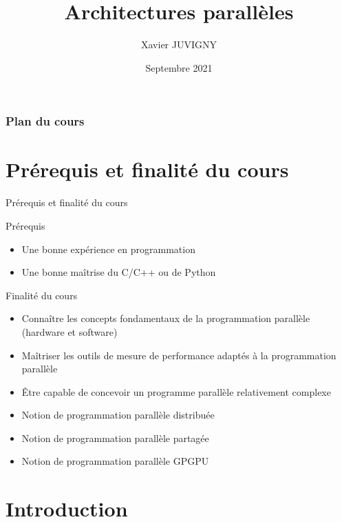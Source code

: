 \documentclass[handout]{beamer}
\title[Architectures parallèles\hspace{2em}]{Architectures parallèles}
\author[Xavier JUVIGNY]{Xavier JUVIGNY}
\date{Septembre 2021}
\institute{ONERA}
\begin{document}
\lstset{escapechar=@,style=customcpp}

\begin{frame}
 \titlepage
\end{frame}

\begin{frame}
\frametitle{Plan du cours}
\tableofcontents
\end{frame}

\section{Prérequis et finalité du cours}

\begin{frame}[fragile]{Prérequis et finalité du cours}

  \begin{block}{Prérequis}
    \begin{itemize}
      \item Une bonne expérience en programmation
      \item Une bonne maîtrise du C/C++ ou de Python
    \end{itemize}
  \end{block}
  
  \begin{block}{Finalité du cours}
    \begin{itemize}
    \item Connaître les concepts fondamentaux de la programmation parallèle (hardware et software)
    \item Maîtriser les outils de mesure de performance adaptés à la programmation parallèle
    \item Être capable de concevoir un programme parallèle relativement complexe
    \item Notion de programmation parallèle distribuée
    \item Notion de programmation parallèle partagée
    \item Notion de programmation parallèle GPGPU
    \end{itemize}
  \end{block}

\end{frame}

\section{Introduction}
\end{document}
